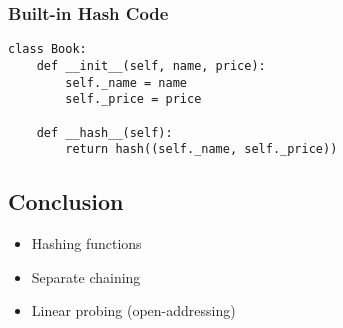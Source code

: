 \documentclass[aspectratio=169, 14pt]{beamer}
\begin{document}
\begin{frame}[fragile]
	\frametitle{Built-in Hash Code}

	\begin{verbatim}
class Book:
    def __init__(self, name, price):
        self._name = name
        self._price = price

    def __hash__(self):
        return hash((self._name, self._price))
    \end{verbatim}

\end{frame}

\begin{frame}

	\section{\textcolor{darkmidnightblue}{Conclusion}}
	\begin{itemize}
		\item Hashing functions
		\item Separate chaining
		\item Linear probing (open-addressing)
	\end{itemize}
\end{frame}
\end{document}
